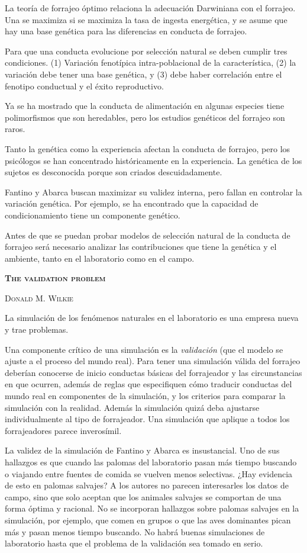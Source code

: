 \documentclass[a4paper,12pt]{article}
\begin{document}
La teoría de forrajeo óptimo relaciona la adecuación Darwiniana con el forrajeo. Una se maximiza si se maximiza la tasa de ingesta energética, y se asume que hay una base genética para las diferencias en conducta de forrajeo.

Para que una conducta evolucione por selección natural se deben cumplir tres condiciones. (1) Variación fenotípica intra-poblacional de la característica, (2) la variación debe tener una base genética, y (3) debe haber correlación entre el fenotipo conductual y el éxito reproductivo. 

Ya se ha mostrado que la conducta de alimentación en algunas especies tiene polimorfismos que son heredables, pero los estudios genéticos del forrajeo son raros. 

Tanto la genética como la experiencia afectan la conducta de forrajeo, pero los psicólogos se han concentrado históricamente en la experiencia. La genética de los sujetos es desconocida porque son criados descuidadamente. 

Fantino y Abarca buscan maximizar su validez interna, pero fallan en controlar la variación genética. Por ejemplo, se ha encontrado que la capacidad de condicionamiento tiene un componente genético.

Antes de que se puedan probar modelos de selección natural de la conducta de forrajeo será necesario analizar las contribuciones que tiene la genética y el ambiente, tanto en el laboratorio como en el campo.

{\scshape\bfseries The validation problem}

{\scshape Donald M. Wilkie}

La simulación de los fenómenos naturales en el laboratorio es una empresa nueva y trae problemas. 

Una componente crítico de una simulación es la {\itshape validación} (que el modelo se ajuste a el proceso del mundo real). Para tener una simulación válida del forrajeo deberían conocerse de inicio conductas básicas del forrajeador y las circunstancias en que ocurren, además de reglas que especifiquen cómo traducir conductas del mundo real en componentes de la simulación, y los criterios para comparar la simulación con la realidad. Además la simulación quizá deba ajustarse individualmente al tipo de forrajeador. Una simulación que aplique a todos los forrajeadores parece inverosímil. 

La validez de la simulación de Fantino y Abarca es insustancial. Uno de sus hallazgos es que cuando las palomas del laboratorio pasan más tiempo buscando o viajando entre fuentes de comida se vuelven menos selectivas. ¿Hay evidencia de esto en palomas salvajes? A los autores no parecen interesarles los datos de campo, sino que solo aceptan que los animales salvajes se comportan de una forma óptima y racional. No se incorporan hallazgos sobre palomas salvajes en la simulación, por ejemplo, que comen en grupos o que las aves dominantes pican más y pasan menos tiempo buscando. No habrá buenas simulaciones de laboratorio hasta que el problema de la validación sea tomado en serio.
\end{document}

